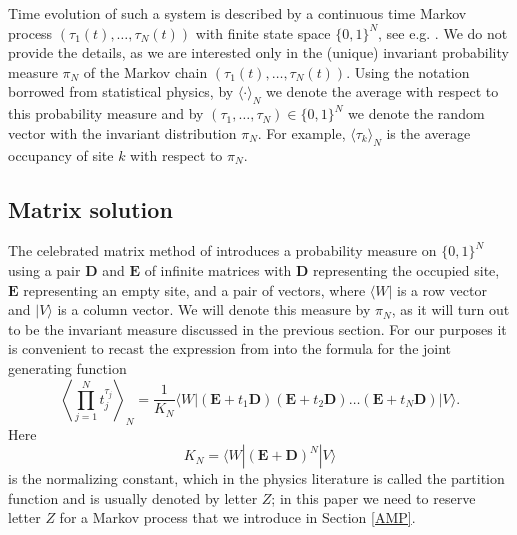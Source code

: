 \documentclass{amsart}
\theoremstyle{definition}
\theoremstyle{remark}
\theoremstyle{remark}
\theoremstyle{definition}
\numberwithin{equation}{section}
\begin{document}
Time evolution of such a system is described by a continuous time Markov process $(\tau_1(t),\dots,\tau_N(t))$ with finite state space  $\{0,1\}^N$, see e.g. \cite[Fromulas (2.1)-(2.3)]{sandow1994partially}.
We do not provide the details,
 as we are interested only in the (unique) invariant probability measure $\pi_N$ of the Markov chain $(\tau_1(t),\dots,\tau_N(t))$.
 Using the notation borrowed from statistical physics, by $\langle \cdot\rangle_N$
  we denote the average with respect to this  probability measure and  by $(\tau_1,\dots,\tau_N)\in\{0,1\}^N$ we denote
  the random vector with the invariant distribution $\pi_N$. For example, ${\langle}\tau_k{\rangle}_N$
  is the average occupancy of site $k$ with respect to $\pi_N$.

\subsection{Matrix solution}
The celebrated matrix method of \citet{derrida1993exact} introduces
a probability measure on $\{0,1\}^N$ using a pair  ${\mathbf{D}}$ and ${\mathbf{E}}$ of infinite matrices with ${\mathbf{D}}$ representing the occupied site, ${\mathbf{E}}$ representing an empty site, and a pair of vectors, where
  $\langle W|$ is a row vector and $|V\rangle$ is a column vector. We will denote this measure by $\pi_N$,
  as it will turn out to be the invariant measure discussed in the previous section.
  For our purposes it is convenient to recast the  expression from \cite{derrida1993exact}
   into the formula for the joint generating function
\begin{equation}
\label{MatrixSolution}
\left\langle \prod_{j=1}^N t_j^{\tau_j}\right\rangle_N=\frac{1}{K_N}\langle W| ({\mathbf{E}}+t_1{\mathbf{D}})({\mathbf{E}}+t_2{\mathbf{D}})\dots({\mathbf{E}}+t_N{\mathbf{D}})|V\rangle.
\end{equation}
Here
 \begin{equation}
   \label{KN}
   K_N=\langle W| ({\mathbf{E}}+ {\mathbf{D}})^N|V\rangle
 \end{equation} is the normalizing constant, which in the physics literature is
 called the partition function and  is usually denoted by letter $Z$; in this paper we need to reserve letter $Z$ for a Markov process that we  introduce in Section \ref{AMP}.
\end{document}
